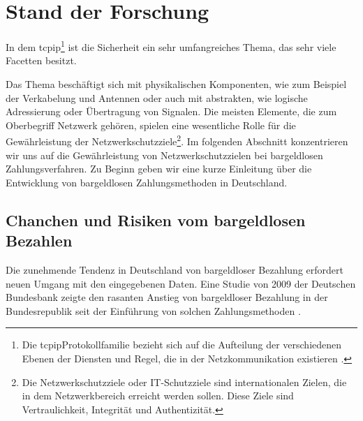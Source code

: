 \section{Stand der Forschung}

In dem \acrfull{tcpip}\footnote{Die \acrshort{tcpip}Protokollfamilie bezieht sich auf die Aufteilung 
der verschiedenen Ebenen der Diensten und Regel, die in der Netzkommunikation existieren \cite{refbook:SWIS}.} ist 
die Sicherheit ein sehr umfangreiches Thema, das sehr viele Facetten besitzt. 


Das Thema beschäftigt sich mit physikalischen 
Komponenten, wie zum Beispiel der Verkabelung und Antennen oder auch mit abstrakten, wie logische Adressierung oder 
Übertragung von Signalen. Die meisten Elemente, die zum Oberbegriff Netzwerk gehören, spielen eine wesentliche Rolle 
für die Gewährleistung der Netzwerkschutzziele\footnote{Die Netzwerkschutzziele oder IT-Schutzziele sind internationalen
Zielen, die in dem Netzwerkbereich erreicht werden sollen. Diese Ziele sind Vertraulichkeit, Integrität und 
Authentizität.}. Im folgenden Abschnitt konzentrieren wir uns auf die Gewährleistung von Netzwerkschutzzielen
bei bargeldlosen Zahlungsverfahren. Zu Beginn geben wir eine kurze Einleitung über die Entwicklung von bargeldlosen
Zahlungsmethoden in Deutschland.


\subsection{Chanchen und Risiken vom bargeldlosen Bezahlen}

Die zunehmende Tendenz in Deutschland von bargeldloser Bezahlung erfordert neuen Umgang mit den eingegebenen Daten. 
Eine Studie von 2009 der Deutschen Bundesbank zeigte den rasanten Anstieg von bargeldloser Bezahlung in der
Bundesrepublik seit der Einführung von solchen Zahlungsmethoden \cite{refrep:DBCP}.

